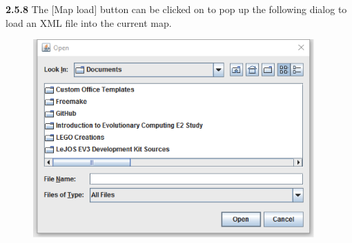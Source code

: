 \documentclass[11pt, a4paper]{article}
\begin{document}
\textbf{2.5.8} The [Map load] button can be clicked on to pop up the following dialog to load an XML file into the current map.\\

\begin{figure}[H]
\centering
\includegraphics[height=3in]{UM4}
\end{figure}
\end{document}
